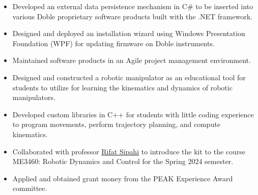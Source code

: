 \documentclass[10pt,a4paper,ragged2e,withhyper]{altacv}
\begin{document}
\begin{paracol}{2}
\begin{itemize}
    \end{itemize}
    \begin{itemize}
        \item Developed an external data persistence mechanism in C\# to be inserted into various Doble proprietary software products built with the .NET framework.
        \item Designed and deployed an installation wizard using Windows Presentation Foundation (WPF) for updating firmware on Doble instruments.
        \item Maintained software products in an Agile project management environment.
    \end{itemize}
    \begin{itemize}
        \item Designed and constructed a robotic manipulator as an educational tool for students to utilize for learning the kinematics and dynamics of robotic manipulators.
        \item Developed custom libraries in C++ for students with little coding experience to program movements, perform trajectory planning, and compute kinematics.
        \item Collaborated with professor \href{https://coe.northeastern.edu/people/sipahi-rifat/}{Rifat Sipahi} to introduce the kit to the course ME3460: Robotic Dynamics and Control for the Spring 2024 semester.
        \item Applied and obtained grant money from the PEAK Experience Award committee.
    \end{itemize}

\end{paracol}
\end{document}
